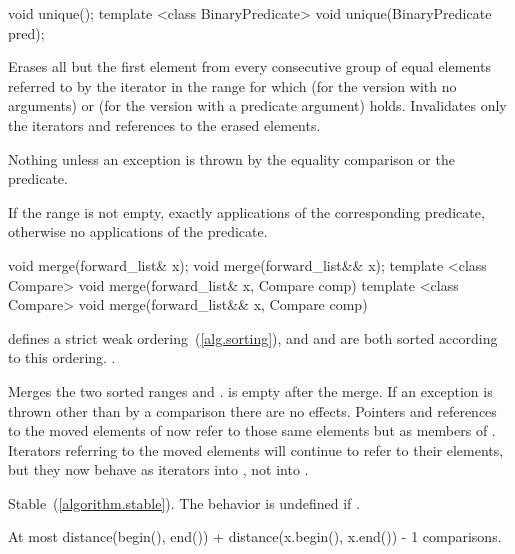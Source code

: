 %
%
\begin{itemdecl}
void unique();
template <class BinaryPredicate> void unique(BinaryPredicate pred);
\end{itemdecl}

\begin{itemdescr}
\pnum
\effects Erases all but the first element from every consecutive
group of equal elements referred to by the iterator  in the range  for which  (for the version with no arguments) or  (for the version with a predicate argument) holds.
Invalidates only the iterators and references to the erased elements.

\pnum
\throws Nothing unless an exception is thrown by the equality comparison or the predicate.

\pnum
\complexity If the range  is not empty, exactly  applications of the corresponding predicate, otherwise no applications of the predicate.
\end{itemdescr}

%
%
\begin{itemdecl}
void merge(forward_list& x);
void merge(forward_list&& x);
template <class Compare> void merge(forward_list& x, Compare comp)
template <class Compare> void merge(forward_list&& x, Compare comp)
\end{itemdecl}

\begin{itemdescr}
\pnum
\requires {} defines a strict weak ordering~(\ref{alg.sorting}), and 
and  are both sorted according to this ordering.
.

\pnum
\effects Merges the two sorted ranges \tcode{[begin(), end())} and
\tcode{[x.begin(), x.end())}.  is empty after the merge. If an
exception is thrown other than by a comparison there are no effects.
Pointers and references to the moved elements of  now refer to those same elements
but as members of . Iterators referring to the moved elements will continue to
refer to their elements, but they now behave as iterators into , not into
.

\pnum
\remarks Stable~(\ref{algorithm.stable}). The behavior is undefined if
.

\pnum
\complexity At most distance(begin(),
end()) + distance(x.begin(), x.end()) - 1 comparisons.
\end{itemdescr}

